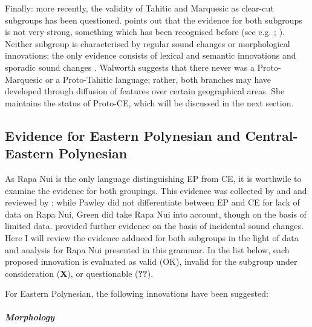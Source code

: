 Finally: more recently, the validity of Tahitic and Marquesic as clear-cut subgroups has been questioned. \citet{Walworth2012} points out that the evidence for both subgroups is not very strong, something which has been recognised before (see e.g. \citealt{Green1966}; \citealt{Marck1996Subgrouping}). Neither subgroup is characterised by regular sound changes or morphological innovations; the only evidence consists of lexical and semantic innovations \citep{Green1966} and sporadic sound changes \citep{Marck2000}. Walworth suggests that there never was a Proto-Marquesic or a Proto-Tahitic language; rather, both branches may have developed through diffusion of features over certain geographical areas. She maintains the status of Proto-CE, which will be discussed in the next section.
\subsection{Evidence for Eastern Polynesian and Central-Eastern Polynesian}\label{sec:1.2.2}

As Rapa Nui is the only language distinguishing EP from CE, it is worthwile to examine the evidence for both groupings. This evidence was collected by \citet{Pawley1966} and \citet{Green1985} and reviewed by \citet{Marck1996Subgrouping}; while Pawley did not differentiate between EP and CE for lack of data on Rapa Nui, Green did take Rapa Nui into account, though on the basis of limited data. \citet{Marck2000} provided further evidence on the basis of incidental sound changes. Here I will review the evidence adduced for both subgroups in the light of data and analysis for Rapa Nui presented in this grammar. In the list below, each proposed innovation is evaluated as valid (OK), invalid for the subgroup under consideration (\textbf{X}), or questionable (\textbf{??}).

For Eastern Polynesian, the following innovations have been suggested:

\subparagraph{Morphology}

